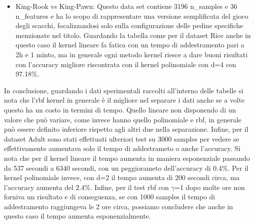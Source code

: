 \documentclass{article}
\begin{document}
\begin{itemize}
		\item King-Rook vs King-Pawn: Questo data set contiene 3196 n\_samples e 36 n\_features e ha lo scopo di rappresentare una versione semplificata del gioco degli scacchi, focalizzandosi solo sulla configurazione delle pedine specifiche menzionate nel titolo. Guardando la tabella come per il dataset Rice anche in questo caso il kernel lineare fa fatica con un tempo di addestramento pari a 2h e 1 minto, ma in generale ogni metodo kernel riesce a dare buoni risultati con l'accuracy migliore riscontrata con il kernel polinomiale con d=4 con 97.18\%.
	\end{itemize}
    In conclusione, guardando i dati sperimentali raccolti all'interno delle tabelle si nota che l'rbf kernel in generale è il migliore nel separare i dati anche se a volte questo ha un costo in termini di tempo. Quello lineare non disponendo di un valore che può variare, come invece hanno quello polinomiale e rbf, in generale può essere definito inferiore rispetto agli altri due nella separazione. Infine, per il dataset Adult sono stati effettuati ulteriori test su 3000 samples per vedere se effettivamente aumentava solo il tempo di addestrameto o anche l'accuracy. Si nota che per il kernel lineare il tempo aumenta in maniera esponenziale passando da 537 secondi a 6340 secondi, con un peggiorameto dell'accuracy di 0.4\%. Per il kernel polinomiale invece, con d=2 il tempo aumenta di 200 secondi circa, ma l'accuracy aumenta del 2.4\%. Infine, per il test rbf con $\gamma$=1 dopo molte ore non forniva un risultato e di conseguenza, se con 1000 samples il tempo di addestramento raggiungeva le 2 ore circa, possiamo concludere che anche in questo caso il tempo aumenta esponenzialmente.
\end{document}
